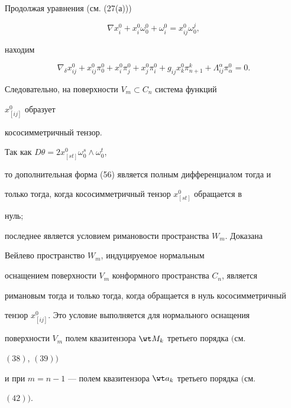  


Продолжая уравнения (см. (27(а)))


$$ 


\nabla x^0_i+x^0_i\omega^0_0+\omega^0_i= 


x^0_{ij}\omega^j_0, 


$$ 


находим 


$$ 


\nabla_\delta x^0_{ij}+x^0_{ij}\pi^0_0+ 


x^0_i\pi^0_j+x^0_j\pi^0_i+g_{ij}x^0_k\pi^k_{n+1}+ 


\Lambda^\alpha_{ij}\pi^0_\alpha=0. 


$$ 


Следовательно, на поверхности $V_m\subset C_n$ система функций 


$x^0_{[ij]}$ образует 


кососимметричный тензор. 


 


Так как $D\theta=2x^0_{[s t]}\omega^s_0\wedge\omega^t_0$, 


то дополнительная форма (56) является полным дифференциалом тогда и 


только тогда, когда кососимметричный тензор $x^0_{[s t]}$ обращается в 


нуль; 


последнее является условием римановости пространства $W_m$. Доказана 


 


\begin{thm} 


Вейлево пространство $W_m$, индуцируемое нормальным 


оснащением поверхности $V_m$ конформного пространства $C_n$, является 


римановым тогда и только тогда, когда обращается в нуль кососимметричный


тензор $x^0_{[ij]}$. Это условие выполняется для нормального оснащения 


поверхности $V_m$ полем квазитензора $\wt M_k$ третьего порядка $($см. 


$(38)$, $(39))$ 


и при $m=n-1$ --- полем квазитензора $\wt a_k$ третьего порядка $($см. 


$(42))$. 


\end{thm} 


